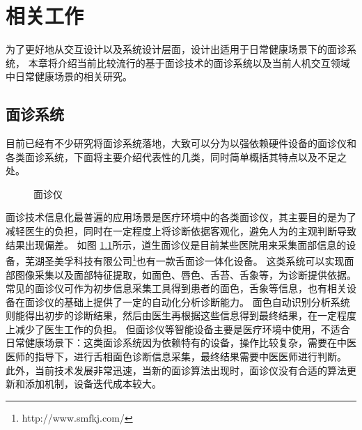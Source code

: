 \chapter{相关工作}

为了更好地从交互设计以及系统设计层面，设计出适用于日常健康场景下的面诊系统，
本章将介绍当前比较流行的基于面诊技术的面诊系统以及当前人机交互领域中日常健康场景的相关研究。

\section{面诊系统}

目前已经有不少研究将面诊系统落地，大致可以分为以强依赖硬件设备的面诊仪和各类面诊系统，下面将主要介绍代表性的几类，同时简单概括其特点以及不足之处。

\begin{figure}[h]
    \centering
    \caption{面诊仪} 
    \label{fig:med}
\end{figure}

面诊技术信息化最普遍的应用场景是医疗环境中的各类面诊仪，其主要目的是为了减轻医生的负担，同时在一定程度上将诊断依据客观化，避免人为的主观判断导致结果出现偏差。
如图 \ref{fig:med}所示，道生面诊仪\cite{邸丹2016手持式舌象仪的研制}是目前某些医院用来采集面部信息的设备，芜湖圣美孚科技有限公司\footnote{http://www.smfkj.com/}也有一款舌面诊一体化设备。
这类系统可以实现面部图像采集以及面部特征提取，如面色、唇色、舌苔、舌象等，为诊断提供依据。
常见的面诊仪可作为初步信息采集工具得到患者的面色，舌象等信息，也有相关设备在面诊仪的基础上提供了一定的自动化分析诊断能力。
面色自动识别分析系统\cite{崔骥2018人工智能背景下中医诊疗技术的应用与展望}则能得出初步的诊断结果，然后由医生再根据这些信息得到最终结果，在一定程度上减少了医生工作的负担。
但面诊仪等智能设备主要是医疗环境中使用，不适合日常健康场景下：这类面诊系统因为依赖特有的设备，操作比较复杂，需要在中医医师的指导下，进行舌相面色诊断信息采集，最终结果需要中医医师进行判断。
此外，当前技术发展非常迅速，当新的面诊算法出现时，面诊仪没有合适的算法更新和添加机制，设备迭代成本较大。

